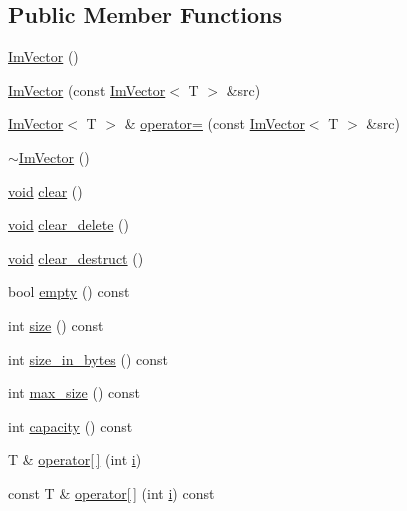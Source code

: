 \subsection*{Public Member Functions}
\begin{DoxyCompactItemize}
\item 
\hyperlink{structImVector_a547fff373659fd848c3ecc6b25a83f25}{Im\+Vector} ()
\item 
\hyperlink{structImVector_a6e2ee59d8b2fa1583617a2110a56aed4}{Im\+Vector} (const \hyperlink{structImVector}{Im\+Vector}$<$ T $>$ \&src)
\item 
\hyperlink{structImVector}{Im\+Vector}$<$ T $>$ \& \hyperlink{structImVector_a0d795963a9fd9d15833fdf87ba292438}{operator=} (const \hyperlink{structImVector}{Im\+Vector}$<$ T $>$ \&src)
\item 
\hyperlink{structImVector_a9b782359ca26eaa1a6a6138fcf341c54}{$\sim$\+Im\+Vector} ()
\item 
\hyperlink{imgui__impl__opengl3__loader_8h_ac668e7cffd9e2e9cfee428b9b2f34fa7}{void} \hyperlink{structImVector_ae2d401b4ec5f1113cdb8edb5a61a38f7}{clear} ()
\item 
\hyperlink{imgui__impl__opengl3__loader_8h_ac668e7cffd9e2e9cfee428b9b2f34fa7}{void} \hyperlink{structImVector_aed9c986ef3cd59fabbd89355d0023122}{clear\+\_\+delete} ()
\item 
\hyperlink{imgui__impl__opengl3__loader_8h_ac668e7cffd9e2e9cfee428b9b2f34fa7}{void} \hyperlink{structImVector_ac1ed34eac753156e87e8a92f78dbbe3f}{clear\+\_\+destruct} ()
\item 
bool \hyperlink{structImVector_aa53e48a5272f4bad1099368769514ff1}{empty} () const
\item 
int \hyperlink{structImVector_a8c903ecb1aaee0601b6a8ad835a4a435}{size} () const
\item 
int \hyperlink{structImVector_ade9f2e937e47b0e0f9970dcfba038204}{size\+\_\+in\+\_\+bytes} () const
\item 
int \hyperlink{structImVector_a6df36345c5943c83cf11b8e827584bf9}{max\+\_\+size} () const
\item 
int \hyperlink{structImVector_ac17681baa8b9b5cd97e556da29f9ef73}{capacity} () const
\item 
T \& \hyperlink{structImVector_afb61bbfb1be8f3db4586854de04173e1}{operator\mbox{[}$\,$\mbox{]}} (int \hyperlink{game__play__state_8cpp_acb559820d9ca11295b4500f179ef6392}{i})
\item 
const T \& \hyperlink{structImVector_af7585c60921f739085229bb8cd78191c}{operator\mbox{[}$\,$\mbox{]}} (int \hyperlink{game__play__state_8cpp_acb559820d9ca11295b4500f179ef6392}{i}) const

\end{DoxyCompactItemize}
